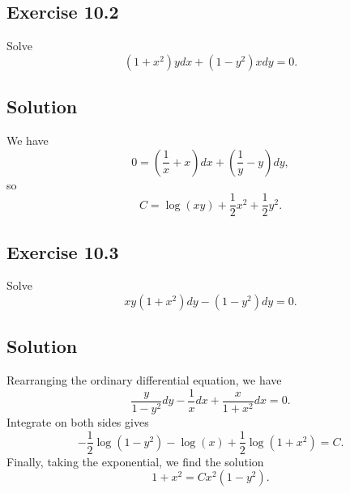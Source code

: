 \subsection*{Exercise 10.2}

Solve
\begin{equation*}
    (1 + x^2) y dx + (1 - y^2) x dy = 0.
\end{equation*}

\subsection*{Solution}

We have
\begin{equation*}
    0 = \left(\frac{1}{x} + x\right)dx + \left(\frac{1}{y} - y\right)dy,
\end{equation*}
so
\begin{equation*}
    C = \log(xy) + \frac{1}{2}x^2 + \frac{1}{2}y^2.
\end{equation*}


\subsection*{Exercise 10.3}

Solve
\begin{equation*}
    xy(1 + x^2) dy - (1 - y^2) dy = 0.
\end{equation*}

\subsection*{Solution}

Rearranging the ordinary differential equation, we have
\begin{equation*}
    \frac{y}{1 - y^2}dy - \frac{1}{x} dx + \frac{x}{1 + x^2} dx = 0.
\end{equation*}
Integrate on both sides gives
\begin{equation*}
    -\frac{1}{2} \log(1 - y^2) - \log(x) + \frac{1}{2} \log(1 + x^2) = C.
\end{equation*}
Finally, taking the exponential, we find the solution
\begin{equation*}
    1 + x^2 = C x^2 (1 - y^2).
\end{equation*}
